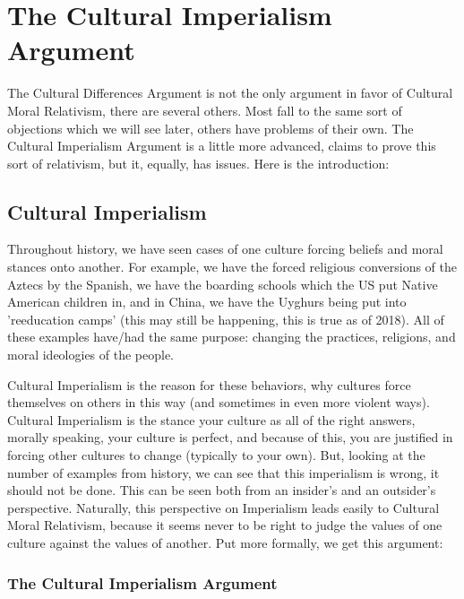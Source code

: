 \section{The Cultural Imperialism Argument}
The Cultural Differences Argument is not the only argument in favor of Cultural Moral Relativism, there are several others. Most fall to the same sort of objections which we will see later, others have problems of their own. The Cultural Imperialism Argument is a little more advanced, claims to prove this sort of relativism, but it, equally, has issues.  Here is the introduction:
\subsection{Cultural Imperialism}

Throughout history, we have seen cases of one culture forcing beliefs and moral stances onto another. For example, we have the forced religious conversions of the Aztecs by the Spanish, we have the boarding schools which the US put Native American children in, and in China, we have the Uyghurs being put into 'reeducation camps' (this may still be happening, this is true as of 2018). All of these examples have/had the same purpose: changing the practices, religions, and moral ideologies of the people.  

Cultural Imperialism is the reason for these behaviors, why cultures force themselves on others in this way (and sometimes in even more violent ways). Cultural Imperialism is the stance your culture as all of the right answers, morally speaking, your culture is perfect, and because of this, you are justified in forcing other cultures to change (typically to your own). But, looking at the number of examples from history, we can see that this imperialism is wrong, it should not be done. This can be seen both from an insider's and an outsider's perspective. Naturally, this perspective on Imperialism leads easily to Cultural Moral Relativism, because it seems never to be right to judge the values of one culture against the values of another. Put more formally, we get this argument:
\subsubsection{The Cultural Imperialism Argument}

